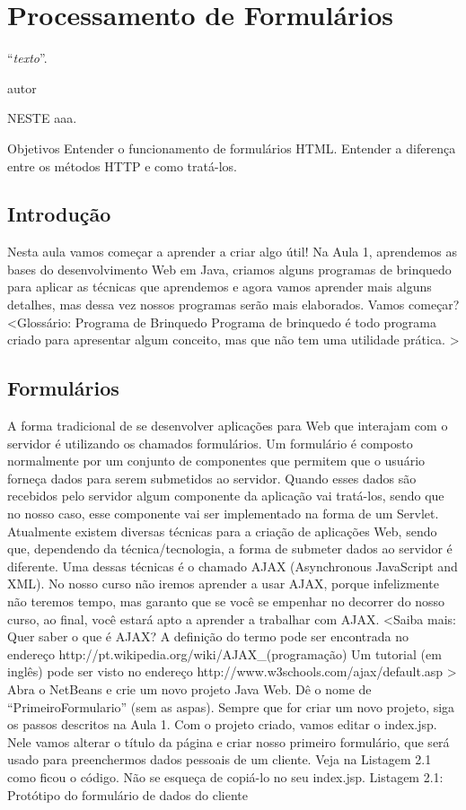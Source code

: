 \chapter{Processamento de Formulários}
\epigraph{``\textit{texto}''.}{autor}

\lettrine[lines=4, lhang=0.1, lraise=0, loversize=0.2, findent=0.1em]{\textcolor{corAzulTema}{N}}{ESTE} aaa.

Objetivos
Entender o funcionamento de formulários HTML.
Entender a diferença entre os métodos HTTP e como tratá-los.


\section{Introdução}

Nesta aula vamos começar a aprender a criar algo útil! Na Aula 1, aprendemos as bases do desenvolvimento Web em Java, criamos alguns programas de brinquedo para aplicar as técnicas que aprendemos e agora vamos aprender mais alguns detalhes, mas dessa vez nossos programas serão mais elaborados. Vamos começar?
<Glossário: Programa de Brinquedo
Programa de brinquedo é todo programa criado para apresentar algum conceito, mas que não tem uma utilidade prática.
>


\section{Formulários}

A forma tradicional de se desenvolver aplicações para Web que interajam com o servidor é utilizando os chamados formulários. Um formulário é composto normalmente por um conjunto de componentes que permitem que o usuário forneça dados para serem submetidos ao servidor. Quando esses dados são recebidos pelo servidor algum componente da aplicação vai tratá-los, sendo que no nosso caso, esse componente vai ser implementado na forma de um Servlet.
Atualmente existem diversas técnicas para a criação de aplicações Web, sendo que, dependendo da técnica/tecnologia, a forma de submeter dados ao servidor é diferente. Uma dessas técnicas é o chamado AJAX (Asynchronous JavaScript and XML). No nosso curso não iremos aprender a usar AJAX, porque infelizmente não teremos tempo, mas garanto que se você se empenhar no decorrer do nosso curso, ao final, você estará apto a aprender a trabalhar com AJAX.
<Saiba mais:
Quer saber o que é AJAX? 
A definição do termo pode ser encontrada no endereço  http://pt.wikipedia.org/wiki/AJAX\_(programação)
Um tutorial (em inglês) pode ser visto no endereço http://www.w3schools.com/ajax/default.asp
 >
Abra o NetBeans e crie um novo projeto Java Web. Dê o nome de “PrimeiroFormulario” (sem as aspas). Sempre que for criar um novo projeto, siga os passos descritos na Aula 1. Com o projeto criado, vamos editar o index.jsp. Nele vamos alterar o título da página e criar nosso primeiro formulário, que será usado para preenchermos dados pessoais de um cliente. Veja na Listagem 2.1 como ficou o código. Não se esqueça de copiá-lo no seu index.jsp.
Listagem 2.1: Protótipo do formulário de dados do cliente
 
